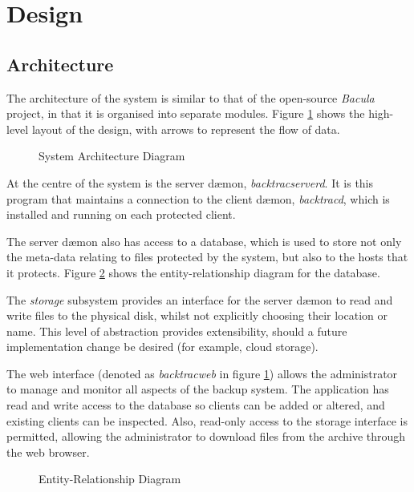 \section{Design}

\subsection{Architecture}

The architecture of the system is similar to that of the open-source
\emph{Bacula} project, in that it is organised into separate modules. Figure
\ref{fig:architecture} shows the high-level layout of the design, with arrows
to represent the flow of data.

\begin{figure}[h]
    \begin{center}
        
    \end{center}
    \caption{System Architecture Diagram}
    \label{fig:architecture}
\end{figure}

At the centre of the system is the server d{\ae}mon, \emph{backtracserverd}.
It is this program that maintains a connection to the client d{\ae}mon,
\emph{backtracd}, which is installed and running on each protected client.

The server d{\ae}mon also has access to a database, which is used to store not
only the meta-data relating to files protected by the system, but also to the
hosts that it protects. Figure \ref{fig:erd} shows the entity-relationship
diagram for the database.

The \emph{storage} subsystem provides an interface for the server d{\ae}mon to
read and write files to the physical disk, whilst not explicitly choosing their
location or name. This level of abstraction provides extensibility, should
a future implementation change be desired (for example, cloud storage).

The web interface (denoted as \emph{backtracweb} in figure
\ref{fig:architecture}) allows the administrator to manage and monitor all
aspects of the backup system. The application has read and write access to the
database so clients can be added or altered, and existing clients can be
inspected. Also, read-only access to the storage interface is permitted,
allowing the administrator to download files from the archive through the web
browser.

\begin{figure}[h]
    \begin{center}
        
    \end{center}
    \caption{Entity-Relationship Diagram}
    \label{fig:erd}
\end{figure}

